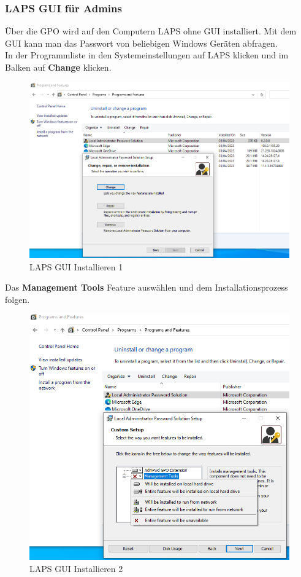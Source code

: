 \subsubsection{LAPS GUI für Admins}
Über die GPO wird auf den Computern LAPS ohne GUI installiert.
Mit dem GUI kann man das Passwort von beliebigen Windows Geräten abfragen.\\

In der Programmliste in den Systemeinstellungen auf LAPS klicken und im Balken auf \textbf{Change} klicken.
\begin{figure}[H]
    \centering
    \includegraphics[width=0.7\linewidth]{../img/LAPS/laps-ui-install.png}
    \caption{LAPS GUI Installieren 1}
\end{figure}

Das \textbf{Management Tools} Feature auswählen und dem Installationsprozess folgen.
\begin{figure}[H]
    \centering
    \includegraphics[width=0.7\linewidth]{../img/LAPS/laps-ui-install-2.png}
    \caption{LAPS GUI Installieren 2}
\end{figure}


